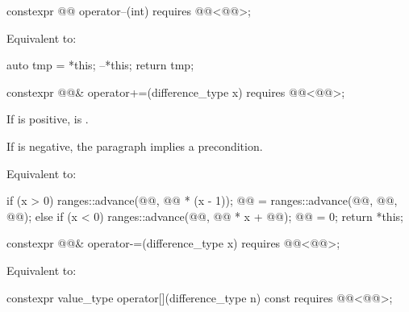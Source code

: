 %
\begin{itemdecl}
constexpr @@ operator--(int) requires @@<@@>;
\end{itemdecl}

\begin{itemdescr}
\pnum
\effects
Equivalent to:
\begin{codeblock}
auto tmp = *this;
--*this;
return tmp;
\end{codeblock}
\end{itemdescr}

%
\begin{itemdecl}
constexpr @@& operator+=(difference_type x)
  requires @@<@@>;
\end{itemdecl}

\begin{itemdescr}
\pnum
\expects
If  is positive,
is .
\begin{note}
If  is negative, the  paragraph implies a precondition.
\end{note}

\pnum
\effects
Equivalent to:
\begin{codeblock}
if (x > 0) {
  ranges::advance(@@, @@ * (x - 1));
  @@ = ranges::advance(@@, @@, @@);
} else if (x < 0) {
  ranges::advance(@@, @@ * x + @@);
  @@ = 0;
}
return *this;
\end{codeblock}
\end{itemdescr}

%
\begin{itemdecl}
constexpr @@& operator-=(difference_type x)
  requires @@<@@>;
\end{itemdecl}

\begin{itemdescr}
\pnum
\effects
Equivalent to: 
\end{itemdescr}

%
\begin{itemdecl}
constexpr value_type operator[](difference_type n) const
  requires @@<@@>;
\end{itemdecl}


